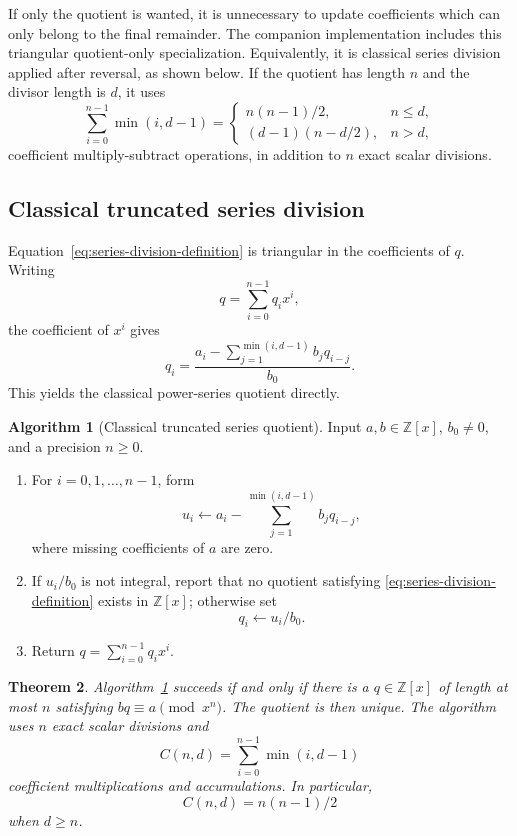 \documentclass[11pt]{book}
\newtheorem{theorem}{Theorem}[section]
\theoremstyle{definition}
\newtheorem{algorithm}[theorem]{Algorithm}
\newcommand{\ZZ}{\mathbb Z}
\begin{document}
If only the quotient is wanted, it is unnecessary to update coefficients which
can only belong to the final remainder.  The companion implementation includes
this triangular quotient-only specialization.  Equivalently, it is classical
series division applied after reversal, as shown below.  If the quotient has
length $n$ and the divisor length is $d$, it uses
\begin{equation}\label{eq:triangular-quotient-count}
 \sum_{i=0}^{n-1}\min(i,d-1)
 =
 \begin{cases}
  n(n-1)/2, & n\leq d,\\[2mm]
  (d-1)(n-d/2), & n>d,
 \end{cases}
\end{equation}
coefficient multiply-subtract operations, in addition to $n$ exact scalar
divisions.

\subsection{Classical truncated series division}

Equation~\eqref{eq:series-division-definition} is triangular in the
coefficients of $q$.  Writing
\[
 q=\sum_{i=0}^{n-1}q_ix^i,
\]
the coefficient of $x^i$ gives
\begin{equation}\label{eq:series-division-recurrence}
 q_i=\frac{a_i-\displaystyle\sum_{j=1}^{\min(i,d-1)}b_jq_{i-j}}{b_0}.
\end{equation}
This yields the classical power-series quotient directly.

\begin{algorithm}[Classical truncated series quotient]\label{alg:series-quo-classical}
Input $a,b\in\ZZ[x]$, $b_0\ne0$, and a precision $n\geq0$.
\begin{enumerate}
 \item For $i=0,1,\ldots,n-1$, form
 \[
  u_i\leftarrow a_i-
  \sum_{j=1}^{\min(i,d-1)}b_jq_{i-j},
 \]
 where missing coefficients of $a$ are zero.
 \item If $u_i/b_0$ is not integral, report that no quotient satisfying
 \eqref{eq:series-division-definition} exists in $\ZZ[x]$; otherwise set
 \[
  q_i\leftarrow u_i/b_0.
 \]
 \item Return $q=\sum_{i=0}^{n-1}q_ix^i$.
\end{enumerate}
\end{algorithm}

\begin{theorem}\label{thm:series-quo-classical}
Algorithm~\ref{alg:series-quo-classical} succeeds if and only if there is a
$q\in\ZZ[x]$ of length at most $n$ satisfying
$bq\equiv a\pmod{x^n}$.  The quotient is then unique.  The algorithm uses $n$
exact scalar divisions and
\[
 C(n,d)=\sum_{i=0}^{n-1}\min(i,d-1)
\]
coefficient multiplications and accumulations.  In particular,
\[
 C(n,d)=n(n-1)/2
\]
when $d\geq n$.
\end{theorem}
\end{document}
